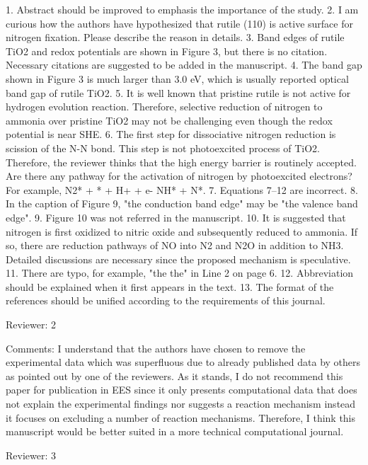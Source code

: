1. Abstract should be improved to emphasis the importance of the study.
2. I am curious how the authors have hypothesized that rutile (110) is active surface for nitrogen fixation. Please describe the reason in details.
3. Band edges of rutile TiO2 and redox potentials are shown in Figure 3, but there is no citation. Necessary citations are suggested to be added in the manuscript.
4. The band gap shown in Figure 3 is much larger than 3.0 eV, which is usually reported optical band gap of rutile TiO2.
5. It is well known that pristine rutile is not active for hydrogen evolution reaction. Therefore, selective reduction of nitrogen to ammonia over pristine TiO2 may not be challenging even though the redox potential is near SHE.
6. The first step for dissociative nitrogen reduction is scission of the N-N bond. This step is not photoexcited process of TiO2. Therefore, the reviewer thinks that the high energy barrier is routinely accepted. Are there any pathway for the activation of nitrogen by photoexcited electrons? For example, N2* + * + H+ + e-  NH* + N*.
7. Equations 7–12 are incorrect.
8. In the caption of Figure 9, "the conduction band edge" may be "the valence band edge".
9. Figure 10 was not referred in the manuscript.
10. It is suggested that nitrogen is first oxidized to nitric oxide and subsequently reduced to ammonia. If so, there are reduction pathways of NO into N2 and N2O in addition to NH3. Detailed discussions are necessary since the proposed mechanism is speculative.
11. There are typo, for example, "the the" in Line 2 on page 6.
12. Abbreviation should be explained when it first appears in the text.
13. The format of the references should be unified according to the requirements of this journal.



Reviewer: 2

Comments:
I understand that the authors have chosen to remove the experimental data which was superfluous due to already published data by others as pointed out by one of the reviewers. As it stands, I do not recommend this paper for publication in EES since it only presents computational data that does not explain the experimental findings nor suggests a reaction mechanism instead it focuses on excluding a number of reaction mechanisms. Therefore, I think this manuscript would be better suited in a more technical computational journal.


Reviewer: 3

